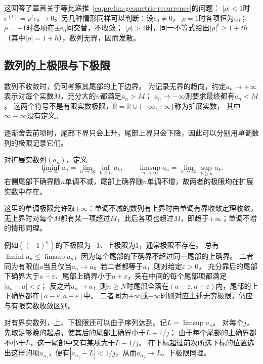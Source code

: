 这回答了章首关于等比递推~\eqref{eq:prelim-geometric-recurrence}的问题：
$|\rho|<1$时$e^{(t)}=\rho^te_0\to0$。另几种情形同样可以判断：设$e_0\neq0$，
$\rho=1$时各项恒为$e_0$；$\rho=-1$时各项在$\pm e_0$间交替，不收敛；
$|\rho|>1$时，同一不等式给出$|\rho|^t\geq1+th$（其中$|\rho|=1+h$），数列无界，因而发散。

\subsection{数列的上极限与下极限}
数列不收敛时，仍可考察其尾部的上下边界。
为记录无界的趋向，约定$a_n\to+\infty$表示对每个实数$M$，充分大的$n$都满足$a_n>M$；
$a_n\to-\infty$则要求最终都有$a_n<M$。
这两个符号不是有限实数极限，$\overline{\mathbb R}=\mathbb R\cup\{-\infty,+\infty\}$称为扩展实数，
其中$\infty-\infty$没有定义。

逐渐舍去前项时，尾部下界只会上升，尾部上界只会下降，因此可以分别用单调数列的极限记录它们。
\begin{definition}[数列的上极限与下极限]
\label{def:analysis-liminf-limsup}
对扩展实数列$(a_n)$，定义
\[
 \liminf_{n\to\infty}a_n
 =\lim_{n\to\infty}\inf_{k\geq n}a_k,
 \qquad
 \limsup_{n\to\infty}a_n
 =\lim_{n\to\infty}\sup_{k\geq n}a_k.
\]
右侧尾部下确界随$n$单调不减，尾部上确界随$n$单调不增，故两者的极限均在扩展实数中存在。
\end{definition}
这里的单调极限允许取$\pm\infty$：单调不减的数列有上界时由单调有界收敛定理收敛，
无上界时对每个$M$都有某一项超过$M$，此后各项也超过$M$，即趋于$+\infty$；单调不增的情形同理。

例如$((-1)^n)$的下极限为$-1$、上极限为$1$，通常极限不存在。
总有$\liminf a_n\leq\limsup a_n$，因为每个尾部的下确界不超过同一尾部的上确界。
二者同为有限值$a$当且仅当$a_n\to a$。若二者都等于$a$，则对给定$\varepsilon>0$，
充分靠后的尾部下确界大于$a-\varepsilon$、尾部上确界小于$a+\varepsilon$，夹在中间的每个尾部项都满足$|a_n-a|<\varepsilon$；
反之若$a_n\to a$，则$n\geq N$时尾部全落在$(a-\varepsilon,a+\varepsilon)$内，尾部的上下确界都在$[a-\varepsilon,a+\varepsilon]$中。
二者同为$+\infty$或$-\infty$时则对应上述无穷极限，仍应与有限实数收敛区别。

对有界实数列，上、下极限还可以由子序列达到。记$L=\limsup a_n$。
对每个$j$，先取足够晚的起点，使其后的尾部上确界小于$L+1/j$；
由于每个尾部的上确界都不小于$L$，这一尾部中又有某项大于$L-1/j$。
在下标超过前次所选下标的位置选出这样的项$a_{n_j}$，便有$|a_{n_j}-L|<1/j$，从而$a_{n_j}\to L$。下极限同理。

\FloatBarrier

